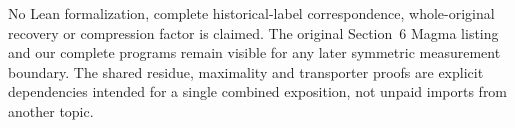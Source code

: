 \documentclass[11pt]{article}
\begin{document}
No Lean formalization, complete historical-label correspondence,
whole-original recovery or compression factor is claimed. The original
Section~6 Magma listing and our complete programs remain visible for
any later symmetric measurement boundary. The shared residue,
maximality and transporter proofs are explicit dependencies intended
for a single combined exposition, not unpaid imports from another topic.
\end{document}
